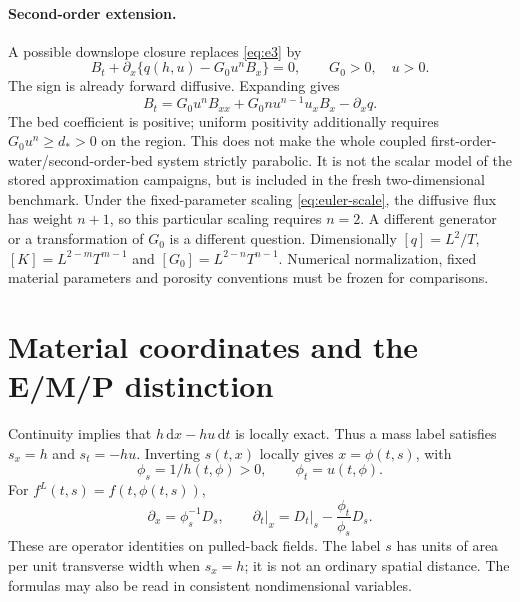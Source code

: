 \documentclass[11pt,a4paper,oneside]{report}
\numberwithin{equation}{chapter}
\newcommand{\dd}{\mathrm d}
\begin{document}
\paragraph{Second-order extension.}
A possible downslope closure replaces \eqref{eq:e3} by
\begin{equation}\label{eq:diffusive}
B_t+\partial_x\{q(h,u)-G_0u^nB_x\}=0,\qquad G_0>0,\quad u>0.
\end{equation}
The sign is already forward diffusive. Expanding gives
\begin{equation}\label{eq:diffusion-expanded}
\boxed{B_t=G_0u^nB_{xx}+G_0nu^{n-1}u_xB_x-\partial_xq.}
\end{equation}
The bed coefficient is positive; uniform positivity additionally requires
$G_0u^n\ge d_*>0$ on the region. This does not make the whole coupled
first-order-water/second-order-bed system strictly parabolic.
It is not the scalar model of the stored approximation campaigns, but is
included in the fresh two-dimensional benchmark.
Under the fixed-parameter scaling \eqref{eq:euler-scale}, the diffusive flux
has weight $n+1$, so this particular scaling requires $n=2$.
A different generator or a transformation of $G_0$ is a different question.
Dimensionally $[q]=L^2/T$, $[K]=L^{2-m}T^{m-1}$ and
$[G_0]=L^{2-n}T^{n-1}$. Numerical normalization, fixed material parameters
and porosity conventions must be frozen for comparisons.

\section{Material coordinates and the E/M/P distinction}
Continuity implies that $h\,\dd x-hu\,\dd t$ is locally exact. Thus a mass label satisfies $s_x=h$ and $s_t=-hu$. Inverting $s(t,x)$ locally gives $x=\phi(t,s)$, with
\begin{equation}
\phi_s=1/h(t,\phi)>0,\qquad \phi_t=u(t,\phi).
\end{equation}
For $f^L(t,s)=f(t,\phi(t,s))$,
\begin{equation}\label{eq:chain}
\partial_x=\phi_s^{-1}D_s,\qquad
\partial_t\big|_x=D_t\big|_s-\frac{\phi_t}{\phi_s}D_s.
\end{equation}
These are operator identities on pulled-back fields. The label $s$ has units of area per unit transverse width when $s_x=h$; it is not an ordinary spatial distance. The formulas may also be read in consistent nondimensional variables.
\end{document}
